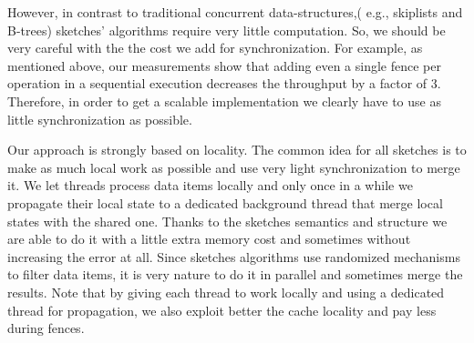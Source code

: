 {%
However, in contrast to traditional concurrent data-structures,(
e.g., skiplists and B-trees) sketches' algorithms require very
little computation.
So, we should be very careful with the the cost we add
for synchronization. 
For example, as mentioned above, our measurements show that
adding even a single fence per operation in a sequential
execution decreases the throughput by a factor of 3.
Therefore, in order to get a scalable implementation we clearly
have to use as little synchronization as possible.

Our approach is strongly based on locality.
The common idea for all sketches is to make as much local work
as possible and use very light synchronization to merge it. 
We let threads process data items locally and only once in a
while we propagate their local state to a dedicated background
thread that merge local states with the shared one.
Thanks to the sketches semantics and structure we are able to do
it with a little extra memory cost and sometimes without
increasing the error at all.
Since sketches algorithms use randomized mechanisms to filter
data items, it is very nature to do it in parallel and sometimes
merge the results.
Note that by giving each thread to work locally and using a
dedicated thread for propagation, we also exploit better the
cache locality and pay less during fences. 

% 
% 
% 
% 
% 
% 
% 
% 
% 
}